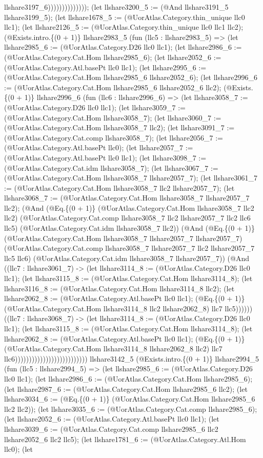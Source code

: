 \documentclass[11pt]{article}
\begin{document}
llshare3197\_6)))))))))))))); (let llshare3200\_5 := (@And llshare3191\_5 llshare3199\_5); (let llshare1678\_5 := (@UorAtlas.Category.thin\_unique llc0 llc1); (let llshare2126\_5 := (@UorAtlas.Category.thin\_unique llc0 llc1 llc2); (@Exists.intro.\{(0 + 1)\} llshare2983\_5 (fun (llc5 : llshare2983\_5) => (let llshare2985\_6 := (@UorAtlas.Category.D26 llc0 llc1); (let llshare2986\_6 := (@UorAtlas.Category.Cat.Hom llshare2985\_6); (let llshare2052\_6 := (@UorAtlas.Category.Atl.basePt llc0 llc1); (let llshare2995\_6 := (@UorAtlas.Category.Cat.Hom llshare2985\_6 llshare2052\_6); (let llshare2996\_6 := (@UorAtlas.Category.Cat.Hom llshare2985\_6 llshare2052\_6 llc2); (@Exists.\{(0 + 1)\} llshare2996\_6 (fun (llc6 : llshare2996\_6) => (let llshare3058\_7 := (@UorAtlas.Category.D26 llc0 llc1); (let llshare3059\_7 := (@UorAtlas.Category.Cat.Hom llshare3058\_7); (let llshare3060\_7 := (@UorAtlas.Category.Cat.Hom llshare3058\_7 llc2); (let llshare3091\_7 := (@UorAtlas.Category.Cat.comp llshare3058\_7); (let llshare2056\_7 := (@UorAtlas.Category.Atl.basePt llc0); (let llshare2057\_7 := (@UorAtlas.Category.Atl.basePt llc0 llc1); (let llshare3098\_7 := (@UorAtlas.Category.Cat.idm llshare3058\_7); (let llshare3067\_7 := (@UorAtlas.Category.Cat.Hom llshare3058\_7 llshare2057\_7); (let llshare3061\_7 := (@UorAtlas.Category.Cat.Hom llshare3058\_7 llc2 llshare2057\_7); (let llshare3068\_7 := (@UorAtlas.Category.Cat.Hom llshare3058\_7 llshare2057\_7 llc2); (@And (@Eq.\{(0 + 1)\} (@UorAtlas.Category.Cat.Hom llshare3058\_7 llc2 llc2) (@UorAtlas.Category.Cat.comp llshare3058\_7 llc2 llshare2057\_7 llc2 llc6 llc5) (@UorAtlas.Category.Cat.idm llshare3058\_7 llc2)) (@And (@Eq.\{(0 + 1)\} (@UorAtlas.Category.Cat.Hom llshare3058\_7 llshare2057\_7 llshare2057\_7) (@UorAtlas.Category.Cat.comp llshare3058\_7 llshare2057\_7 llc2 llshare2057\_7 llc5 llc6) (@UorAtlas.Category.Cat.idm llshare3058\_7 llshare2057\_7)) (@And ((llc7 : llshare3061\_7) -> (let llshare3114\_8 := (@UorAtlas.Category.D26 llc0 llc1); (let llshare3115\_8 := (@UorAtlas.Category.Cat.Hom llshare3114\_8); (let llshare3116\_8 := (@UorAtlas.Category.Cat.Hom llshare3114\_8 llc2); (let llshare2062\_8 := (@UorAtlas.Category.Atl.basePt llc0 llc1); (@Eq.\{(0 + 1)\} (@UorAtlas.Category.Cat.Hom llshare3114\_8 llc2 llshare2062\_8) llc7 llc5)))))) ((llc7 : llshare3068\_7) -> (let llshare3114\_8 := (@UorAtlas.Category.D26 llc0 llc1); (let llshare3115\_8 := (@UorAtlas.Category.Cat.Hom llshare3114\_8); (let llshare2062\_8 := (@UorAtlas.Category.Atl.basePt llc0 llc1); (@Eq.\{(0 + 1)\} (@UorAtlas.Category.Cat.Hom llshare3114\_8 llshare2062\_8 llc2) llc7 llc6)))))))))))))))))))))))))) llshare3142\_5 (@Exists.intro.\{(0 + 1)\} llshare2994\_5 (fun (llc5 : llshare2994\_5) => (let llshare2985\_6 := (@UorAtlas.Category.D26 llc0 llc1); (let llshare2986\_6 := (@UorAtlas.Category.Cat.Hom llshare2985\_6); (let llshare2987\_6 := (@UorAtlas.Category.Cat.Hom llshare2985\_6 llc2); (let llshare3034\_6 := (@Eq.\{(0 + 1)\} (@UorAtlas.Category.Cat.Hom llshare2985\_6 llc2 llc2)); (let llshare3035\_6 := (@UorAtlas.Category.Cat.comp llshare2985\_6); (let llshare2052\_6 := (@UorAtlas.Category.Atl.basePt llc0 llc1); (let llshare3039\_6 := (@UorAtlas.Category.Cat.comp llshare2985\_6 llc2 llshare2052\_6 llc2 llc5); (let llshare1781\_6 := (@UorAtlas.Category.Atl.Hom llc0); (let 
\end{document}

